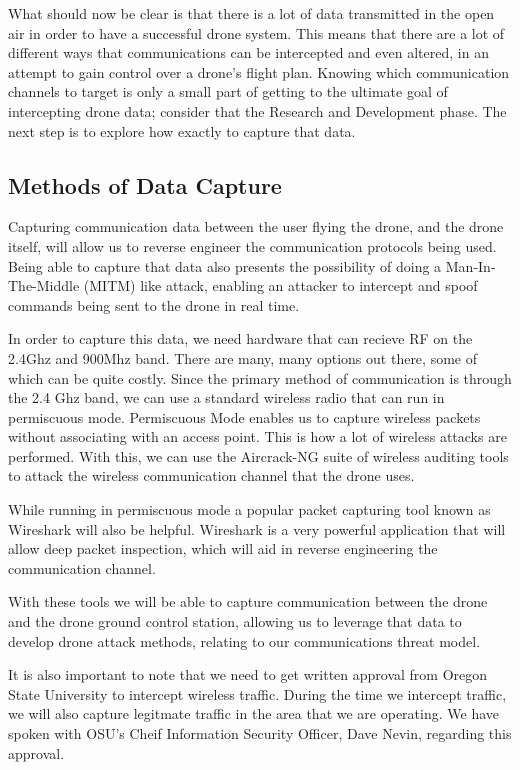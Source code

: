 \documentclass[IEEEtran,letterpaper,10pt,titlepage,draftclsnofoot,onecolumn]{article}
\begin{document}
What should now be clear is that there is a lot of data transmitted in the open air in order to have a successful
drone system. This means that there are a lot of different ways that communications can be intercepted and even
altered, in an attempt to gain control over a drone's flight plan. Knowing which communication channels to target
is only a small part of getting to the ultimate goal of intercepting drone data; consider that the Research and
Development phase. The next step is to explore how exactly to capture that data.

\subsection*{Methods of Data Capture}
Capturing communication data between the user flying the drone, and the drone itself, will allow us to reverse engineer
the communication protocols being used. Being able to capture that data also presents the possibility of doing a
Man-In-The-Middle (MITM) like attack, enabling an attacker to intercept and spoof commands being sent to the drone
in real time.

In order to capture this data, we need hardware that can recieve RF on the 2.4Ghz and 900Mhz band. There are many, many
options out there, some of which can be quite costly. Since the primary method of communication is through the 2.4 Ghz
band, we can use a standard wireless radio that can run in permiscuous mode\cite{WiFiPerc}. Permiscuous Mode enables
us to capture wireless packets without associating with an access point. This is how a lot of wireless attacks are
performed\cite{WiFiPerc}. With this, we can use the Aircrack-NG suite of wireless auditing tools to attack the wireless
communication channel that the drone uses\cite{AircrackNG}.

While running in permiscuous mode a popular packet capturing tool known as Wireshark will also be helpful. Wireshark
is a very powerful application that will allow deep packet inspection, which will aid in reverse engineering the
communication channel\cite{WiFiPerc}.

With these tools we will be able to capture communication between the drone and the drone ground control station, allowing
us to leverage that data to develop drone attack methods, relating to our communications threat model.

It is also important to note that we need to get written approval from Oregon State University to intercept wireless traffic. During the time we intercept traffic, we will also capture legitmate traffic in the area that we are operating.
We have spoken with OSU's Cheif Information Security Officer, Dave Nevin, regarding this approval.
\end{document}
